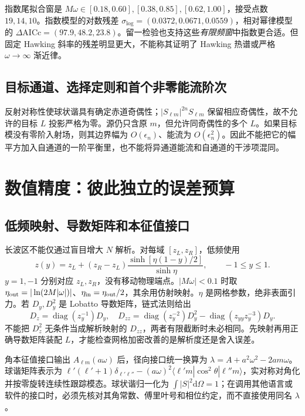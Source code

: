 \documentclass[UTF8,fontset=fandol,11pt,a4paper]{ctexart}
\newcommand{\dd}{\mathrm d}
\begin{document}
指数尾拟合窗是 $M\omega\in[0.18,0.60],[0.38,0.85],[0.62,1.00]$，接受点数 $19,14,10$。指数模型的对数残差 $\sigma_{\log}=(0.0372,0.0671,0.0559)$，相对幂律模型的 $\Delta\mathrm{AICc}=(97.9,48.2,23.8)$。留一检验也支持这些\emph{有限频窗}中指数更合适。但固定 Hawking 斜率的残差明显更大，不能称其证明了 Hawking 热谱或严格 $\omega\to\infty$ 渐近律。

\subsection{目标通道、选择定则和首个非零能流阶次}
反射对称性使球状谐具有确定赤道奇偶性；$|S_{\ell m}|^{2n}S_{\ell m}$ 保留相应奇偶性，故不允许的目标 $L$ 投影严格为零。源仍只含原 $m$，但允许同奇偶性的多个 $L$。如果目标模没有零阶入射场，则其边界幅为 $O(\epsilon_n)$、能流为 $O(\epsilon_n^2)$。因此不能把它的幅平方加入自通道的一阶平衡里，也不能将异通道能流和自通道的干涉项混同。

\section{数值精度：彼此独立的误差预算}
\subsection{低频映射、导数矩阵和本征值接口}
长波区不能仅通过盲目增大 $N$ 解析。对每域 $[z_L,z_R]$，低频使用
\begin{equation}
 z(y)=z_L+(z_R-z_L)\frac{\sinh[\eta(1-y)/2]}{\sinh\eta},\qquad -1\le y\le1.
\end{equation}
$y=1,-1$ 分别对应 $z_L,z_R$，没有移动物理端点。$|M\omega|<0.1$ 时取 $\eta_{\rm out}=|\ln(2M|\omega|)|$、$\eta_{\rm in}=\eta_{\rm out}/2$，其余用仿射映射。$\eta$ 是网格参数，绝非表面引力。若 $D_y,D_y^2$ 是 Lobatto 导数矩阵，链式法则给出
\begin{equation}
 D_z=\operatorname{diag}(z_y^{-1})D_y,\quad
 D_{zz}=\operatorname{diag}(z_y^{-2})D_y^2
 -\operatorname{diag}(z_{yy}z_y^{-3})D_y.
\end{equation}
不能把 $D_z^2$ 无条件当成解析映射的 $D_{zz}$，两者有限截断时未必相同。先映射再用正确导数矩阵装配 $L$，才能检查网格加密改善的是解析度还是舍入误差。

角本征值接口输出 $A_{\ell m}(a\omega)$ 后，径向接口统一换算为 $\lambda=A+a^2\omega^2-2am\omega$。球谐矩阵表示为 $\ell'(\ell'+1)\delta_{\ell'\ell''}-(a\omega)^2\langle\ell'm|\cos^2\theta|\ell''m\rangle$，实对称对角化并按零旋转连续性跟踪模态。球状谐归一化为 $\int|S|^2\dd\Omega=1$；在调用其他语言或软件的接口时，必须先核对其角常数、傅里叶号和相位约定，而不直接使用同名 $\lambda$。
\end{document}

